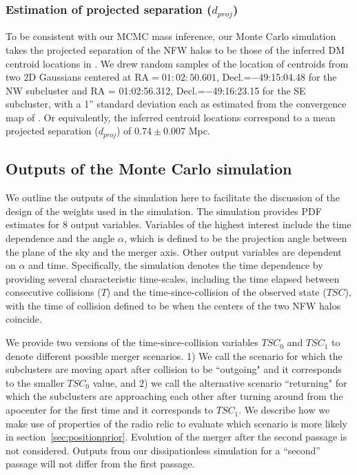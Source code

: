 \subsubsection{Estimation of projected separation ($d_{proj}$)} 
To be consistent with our MCMC mass inference, our Monte Carlo simulation takes 
the projected separation of the NFW halos to be those of the inferred
DM centroid locations in \citealt{Jee13}. We drew random samples
 of the location of centroids from two 2D Gaussians centered at
 RA$=01:02:50.601$, Decl.=$-$49:15:04.48 for the NW subcluster and RA =
 01:02:56.312, Decl.=$-$49:16:23.15 for the SE
subcluster, with a 1'' standard deviation each as estimated from the
convergence map of \citet{Jee13}. Or equivalently, the
inferred centroid locations correspond to a mean projected separation
($d_{proj}$) of $0.74\pm {0.007}$ Mpc. 
\subsection{Outputs of the Monte Carlo simulation}\label{sec: outputs}
%

We outline the outputs of the simulation here to facilitate the discussion
of the design of the weights used in the simulation. The simulation
provides PDF estimates for 8 output variables. Variables
of the highest interest include the time dependence and the angle $\alpha$, which is
defined to be the projection angle between the plane of the sky and the
merger axis. Other output variables are dependent on $\alpha$ and time. Specifically, the simulation denotes the time dependence by
providing several characteristic time-scales, including the time
elapsed between consecutive collisions
($T$) and the time-since-collision of the observed state ($TSC$), with the
time of collision defined to be when the centers of the two NFW halos coincide. 

We provide two versions of the time-since-collision variables $TSC_0$ and
$TSC_1$ to denote different possible merger scenarios. 1) We call the scenario for which the subclusters are
moving apart after collision to be ``outgoing" and it corresponds to the
smaller $TSC_0$ value, and 2) we call the alternative scenario 
``returning" for which the subclusters are approaching each other after turning
around from the apocenter for the first time and it corresponds to $TSC_1$.
We describe how we make use of properties of the radio relic to evaluate
which scenario is more likely in
section~\ref{sec:positionprior}. Evolution of the merger after the second
passage is not considered. Outputs from our dissipationless simulation for
a ``second'' passage will not differ from the first passage.
 
